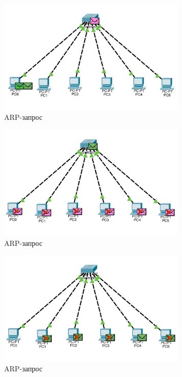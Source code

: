 \documentclass[a4paper, 14pt]{extarticle}
\begin{document}
\begin{figure}[H]
  \centering
  \includegraphics[width=0.8\textwidth]{images/task-1/arp-1.png}
  \caption{ARP-запрос}
  \label{fig:task-1:arp-1}
\end{figure}

\begin{figure}[H]
  \centering
  \includegraphics[width=0.8\textwidth]{images/task-1/arp-2.png}
  \caption{ARP-запрос}
  \label{fig:task-1:arp-2}
\end{figure}

\begin{figure}[H]
  \centering
  \includegraphics[width=0.8\textwidth]{images/task-1/arp-3.png}
  \caption{ARP-запрос}
  \label{fig:task-1:arp-3}
\end{figure}
\end{document}
